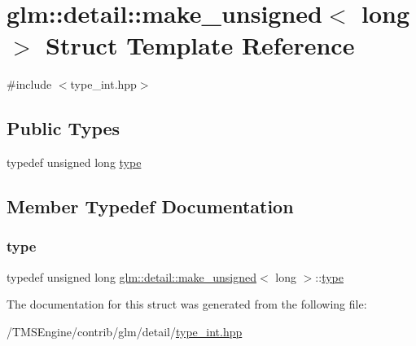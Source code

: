 \hypertarget{structglm_1_1detail_1_1make__unsigned_3_01long_01_4}{}\section{glm\+:\+:detail\+:\+:make\+\_\+unsigned$<$ long $>$ Struct Template Reference}
\label{structglm_1_1detail_1_1make__unsigned_3_01long_01_4}


{\ttfamily \#include $<$type\+\_\+int.\+hpp$>$}

\subsection*{Public Types}
\begin{DoxyCompactItemize}
\item 
typedef unsigned long \hyperlink{structglm_1_1detail_1_1make__unsigned_3_01long_01_4_ade0cc74f63e30969e7d7b42eb6ac8289}{type}
\end{DoxyCompactItemize}


\subsection{Member Typedef Documentation}
\mbox{\label{structglm_1_1detail_1_1make__unsigned_3_01long_01_4_ade0cc74f63e30969e7d7b42eb6ac8289}} 
\subsubsection{\texorpdfstring{type}{type}}
{\footnotesize\ttfamily typedef unsigned long \hyperlink{structglm_1_1detail_1_1make__unsigned}{glm\+::detail\+::make\+\_\+unsigned}$<$ long $>$\+::\hyperlink{structglm_1_1detail_1_1make__unsigned_3_01long_01_4_ade0cc74f63e30969e7d7b42eb6ac8289}{type}}



The documentation for this struct was generated from the following file\+:\begin{DoxyCompactItemize}
\item 
/\+T\+M\+S\+Engine/contrib/glm/detail/\hyperlink{type__int_8hpp}{type\+\_\+int.\+hpp}\end{DoxyCompactItemize}
